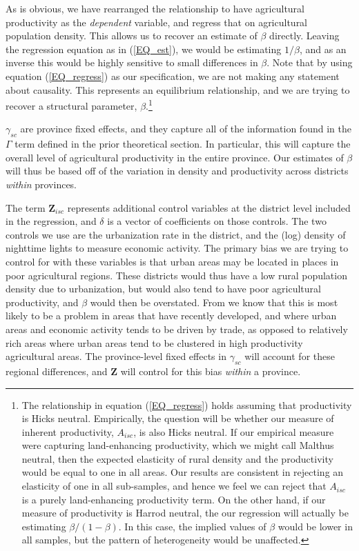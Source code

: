 \documentclass[11pt]{article}
\begin{document}
As is obvious, we have rearranged the relationship to have agricultural productivity as the \textit{dependent} variable, and regress that on agricultural population density. This allows us to recover an estimate of $\beta$ directly. Leaving the regression equation as in (\ref{EQ_est}), we would be estimating $1/\beta$, and as an inverse this would be highly sensitive to small differences in $\beta$. Note that by using equation (\ref{EQ_regress}) as our specification, we are not making any statement about causality. This represents an equilibrium relationship, and we are trying to recover a structural parameter, $\beta$.\footnote{The relationship in equation (\ref{EQ_regress}) holds assuming that productivity is Hicks neutral. Empirically, the question will be whether our measure of inherent productivity, $A_{isc}$, is also Hicks neutral. If our empirical measure were capturing land-enhancing productivity, which we might call Malthus neutral, then the expected elasticity of rural density and the productivity would be equal to one in all areas. Our results are consistent in rejecting an elasticity of one in all sub-samples, and hence we feel we can reject that $A_{isc}$ is a purely land-enhancing productivity term. On the other hand, if our measure of productivity is Harrod neutral, the our regression will actually be estimating $\beta/(1-\beta)$. In this case, the implied values of $\beta$ would be lower in all samples, but the pattern of heterogeneity would be unaffected.}

$\gamma_{sc}$ are province fixed effects, and they capture all of the information found in the $\Gamma$ term defined in the prior theoretical section. In particular, this will capture the overall level of agricultural productivity in the entire province. Our estimates of $\beta$ will thus be based off of the variation in density and productivity across districts \textit{within} provinces. 

The term $\mathbf{Z}_{isc}$ represents additional control variables at the district level included in the regression, and $\delta$ is a vector of coefficients on those controls. The two controls we use are the urbanization rate in the district, and the (log) density of nighttime lights to measure economic activity. The primary bias we are trying to control for with these variables is that urban areas may be located in places in poor agricultural regions. These districts would thus have a low rural population density due to urbanization, but would also tend to have poor agricultural productivity, and $\beta$ would then be overstated. From \citet{hssw2016} we know that this is most likely to be a problem in areas that have recently developed, and where urban areas and economic activity tends to be driven by trade, as opposed to relatively rich areas where urban areas tend to be clustered in high productivity agricultural areas. The province-level fixed effects in $\gamma_{sc}$ will account for these regional differences, and $\mathbf{Z}$ will control for this bias \textit{within} a province.
\end{document}
